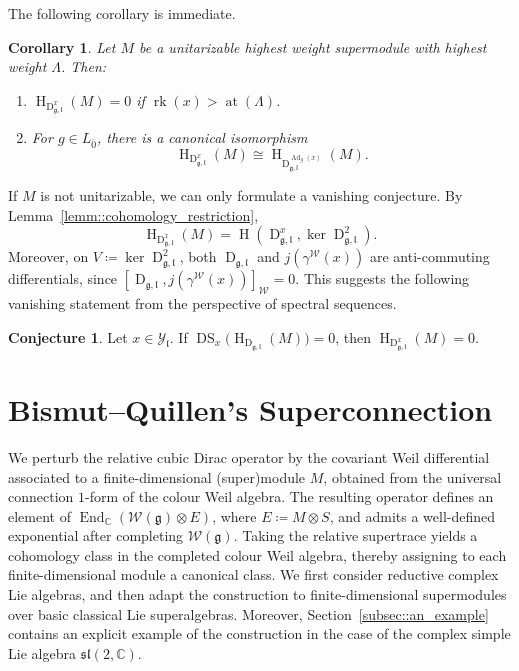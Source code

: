 \documentclass[11pt]{amsart}
\newcommand{\DS}{\operatorname{DS}}
\newcommand{\End}{\operatorname{End}}
\newcommand{\Dirac}{\operatorname{D}}
\def\WW{{\mathcal{W}}}
\def\Weil{{\mathcal{W}(\gg)}}
\def\CC{{\mathbb C}}
\def\rk{{\operatorname{rk}}}
\def\H{{\operatorname{H}}}
\def\Dx{{\operatorname{D}_{\gg,\ll}^{x}}}
\def\ll{{\mathfrak l}}
\def\YY{{\mathcal Y}}
\def \at{{\operatorname{at}}}
\def\gg{{\mathfrak{g}}}
\newcommand{\Ad}{\operatorname{Ad}}
\theoremstyle{plain}
\newtheorem{corollary}[theorem]{Corollary}
\theoremstyle{remark}
\theoremstyle{definition}
\newtheorem{conjecture}[theorem]{Conjecture}
\numberwithin{equation}{section}
\theoremstyle{remark}
\begin{document}
The following corollary is immediate.

\begin{corollary}
Let $M$ be a unitarizable highest weight supermodule with highest weight $\Lambda$. Then:
\begin{enumerate}
\item[a)] $\H_{\Dx}(M)=0$ if $\rk(x) > \at(\Lambda)$.
\item[b)] For $g\in L_{\bar 0}$, there is a canonical isomorphism
\[
\H_{\Dx}(M)\cong \H_{\Dirac^{\!\Ad_{g}(x)}_{\gg,\ll}}(M).
\]
\end{enumerate}
\end{corollary}

If $M$ is not unitarizable, we can only formulate a vanishing conjecture. By Lemma~\ref{lemm::cohomology_restriction},
\[
\H_{\Dx}(M)=\H(\Dx,\ker \Dirac_{\gg,\ll}^{2}).
\]
Moreover, on $V\coloneqq \ker \Dirac_{\gg,\ll}^{2}$, both $\Dirac_{\gg,\ll}$ and $j(\gamma^{\WW}(x))$ are anti-commuting differentials, since
$
[\Dirac_{\gg,\ll},j(\gamma^{\WW}(x))]_{\WW}=0.
$
This suggests the following vanishing statement from the perspective of spectral sequences.

\begin{conjecture}
Let $x\in\YY_{\ll}$. If $\DS_{x}\bigl(\H_{\Dirac_{\gg,\ll}}(M)\bigr)=0$, then
$
\H_{\Dirac^{x}_{\gg,\ll}}(M)=0.
$
\end{conjecture}


\section{Bismut--Quillen's Superconnection} \label{sec::Bismut_Quillen}

We perturb the relative cubic Dirac operator by the covariant Weil differential associated to a finite-dimensional (super)module $M$, obtained from the universal connection $1$-form of the colour Weil algebra. The resulting operator defines an element of $\End_{\CC}(\Weil\otimes E)$, where $E\coloneqq M\otimes S$, and admits a well-defined exponential after completing $\Weil$. Taking the relative supertrace yields a cohomology class in the completed colour Weil algebra, thereby assigning to each finite-dimensional module a canonical class. We first consider reductive complex Lie algebras, and then adapt the construction to finite-dimensional supermodules over basic classical Lie superalgebras. Moreover, Section~\ref{subsec::an_example} contains an explicit example of the construction in the case of the complex simple Lie algebra $\mathfrak{sl}(2,\CC)$.
\end{document}
